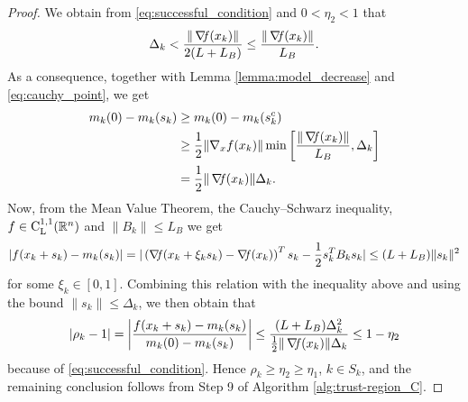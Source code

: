 \documentclass[10pt,a4paper]{article}
\begin{document}
\begin{proof}
	We obtain from \eqref{eq:successful_condition} and $0 < \eta_2 < 1$ that
	\begin{equation*}
		\Delta_k < \frac{\|\operatorname*{\mathit{\nabla \!f}}(x_k)\|}{2(L + L_B)} \leq \frac{\|\operatorname*{\mathit{\nabla \!f}}(x_k)\|}{L_B}.
	\end{equation*}
	As a consequence, together with Lemma \ref{lemma:model_decrease} and \eqref{eq:cauchy_point}, we get
	\begin{align*}
		m_k(0) - m_k(s_k) &\geq m_k(0) - m_k(s_k^c) \\
		&\geq \frac{1}{2} \|\nabla_x f(x_k)\| \min \left[ \frac{\|\operatorname*{\mathit{\nabla \!f}}(x_k)\|}{L_B}, \Delta_k \right] \\
		&= \frac{1}{2} \|\operatorname*{\mathit{\nabla \!f}}(x_k)\| \Delta_k.
	\end{align*}
	Now, from the Mean Value Theorem, the Cauchy--Schwarz inequality, $f\in \mathord{\mathrm{C^{1,1}_{L}}}(\mathbb{R}^n)$ and $\|B_k\| \leq L_B$ we get
	\begin{equation*}
		|f(x_k + s_k) - m_k(s_k)| = |\left(\operatorname*{\mathit{\nabla \!f}}(x_k+\xi_k s_k) - \operatorname*{\mathit{\nabla \!f}}(x_k) \right)^Ts_k  - \frac{1}{2}  s_k^TB_k s_k | \leq (L + L_B) \|s_k\|^2
	\end{equation*}
	for some $\xi_k \in [0, 1]$. Combining this relation with the inequality above and using the bound $\|s_k\| \leq \Delta_k$, we then obtain that
	\begin{equation*}
		|\rho_k - 1| = \left| \frac{f(x_k + s_k) - m_k(s_k)}{m_k(0) - m_k(s_k)} \right| \leq \frac{(L + L_B) \Delta_k^2}{\frac{1}{2} \|\operatorname*{\mathit{\nabla \!f}}(x_k)\| \Delta_k} \leq 1 - \eta_2
	\end{equation*}
	because of \eqref{eq:successful_condition}. Hence $\rho_k \geq \eta_2 \geq \eta_1$, $k \in S_k$, and the remaining conclusion follows from Step 9 of Algorithm \ref{alg:trust-region_C}. 
\end{proof} 
\end{document}
